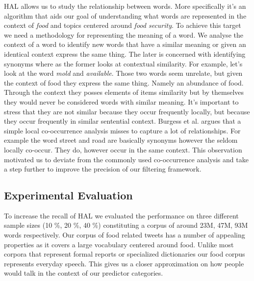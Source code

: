 HAL allows us to study the relationship between words. More specifically it's an algorithm that aids our goal of understanding what words are represented in the context of \emph{food} and topics centered around \emph{food security}. To achieve this target we need a methodology for representing the meaning of a word. We analyse the context of a word to identify new words that have a similar meaning or given an identical context express the same thing. The later is concerned with identifying synonyms where as the former looks at contextual similarity. For example, let's look at the word \emph {mold} and \emph {available}. Those two words seem unrelate, but given the context of food they express the same thing.  Namely an abundance of food. Through the context they posses elements of items similarity but by themselves they would never be considered words with similar meaning. It's important to stress that they are not similar because they occur frequently locally, but because they occur frequently in similar sentential context. Burgess et al. \cite{burgess98} argues that a simple local co-occurrence analysis misses to capture a lot of relationships. For example the word street and road are basically synonyms however the seldom locally co-occur. They do, however occur in the same context. This observation motivated us to deviate from the commonly used co-occurrence analysis and take a step further to improve the precision of our filtering framework. 







 











\subsection{Experimental Evaluation}
\label{sec:exp_eval}

To increase the recall of HAL we evaluated the performance on three different sample sizes (10 \%, 20 \%, 40 \%) constituting a corpus of around 23M, 47M, 93M words respectively. Our corpus of food related tweets has a number of appealing properties as it covers a large vocabulary centered around food. Unlike most corpora that represent formal reports or specialized dictionaries our food corpus represents everyday speech. This gives us a closer approximation on how people would talk in the context of our predictor categories. 

